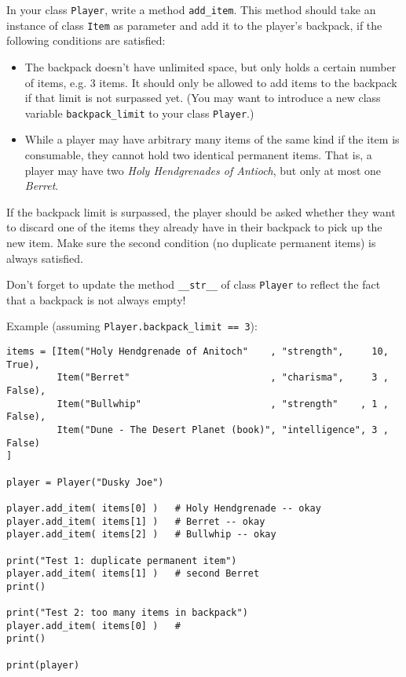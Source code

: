 \documentclass[
	english,
	fontsize=10pt,
	parskip=half,
	titlepage=true,
	DIV=12
]{scrartcl}
\newcommand*{\inPy}[1]{\texttt{#1}}
\newcommand*{\eg}{e.\;g. }
\begin{document}
In your class \texttt{Player}, write a method \texttt{add\_item}. This method should take an instance of class \texttt{Item} as parameter and add it to the player's backpack, if the following conditions are satisfied:
\begin{itemize}
\item The backpack doesn't have unlimited space, but only holds a certain number of items, \eg 3 items. It should only be allowed to add items to the backpack if that limit is not surpassed yet. (You may want to introduce a new class variable \texttt{backpack\_limit} to your class \texttt{Player}.)
\item While a player may have arbitrary many items of the same kind if the item is consumable, they cannot hold two identical permanent items. That is, a player may have two \emph{Holy Hendgrenades of Antioch}, but only at most one \emph{Berret}.
\end{itemize}

If the backpack limit is surpassed, the player should be asked whether they want to discard one of the items they already have in their backpack to pick up the new item. Make sure the second condition (no duplicate permanent items) is always satisfied.

Don't forget to update the method \inPy{__str__} of class \texttt{Player} to reflect the fact that a backpack is not always empty!

Example (assuming \texttt{Player.backpack\_limit == 3}):
\begin{verbatim}
items = [Item("Holy Hendgrenade of Anitoch"    , "strength",     10, True),
         Item("Berret"                         , "charisma",     3 , False),
         Item("Bullwhip"                       , "strength"    , 1 , False),
         Item("Dune - The Desert Planet (book)", "intelligence", 3 , False)
]

player = Player("Dusky Joe")

player.add_item( items[0] )   # Holy Hendgrenade -- okay
player.add_item( items[1] )   # Berret -- okay
player.add_item( items[2] )   # Bullwhip -- okay

print("Test 1: duplicate permanent item")
player.add_item( items[1] )   # second Berret
print()

print("Test 2: too many items in backpack")
player.add_item( items[0] )   # 
print()

print(player)
\end{verbatim}
\end{document}
